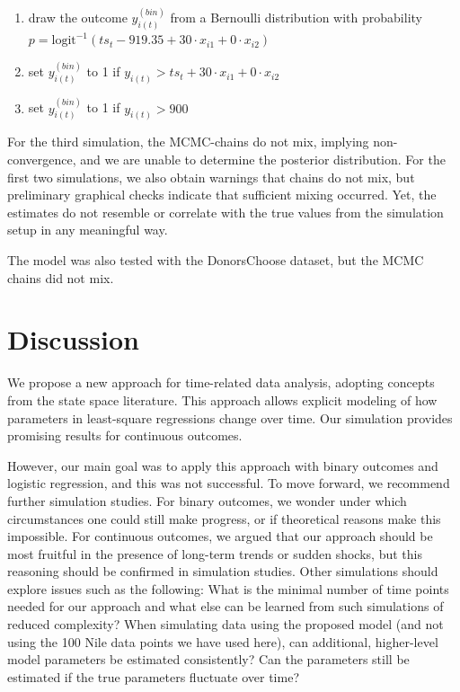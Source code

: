 \documentclass{article}
\begin{document}
\begin{enumerate}
    \item draw the outcome $y^{(bin)}_{i(t)}$ from a Bernoulli distribution with probability $p = \textrm{logit}^{-1}(ts_t - 919.35 + 30 \cdot x_{i1} + 0 \cdot x_{i2})$
    \item set $y^{(bin)}_{i(t)}$ to 1 if $y_{i(t)} > ts_t + 30 \cdot x_{i1} + 0 \cdot x_{i2}$
    \item set $y^{(bin)}_{i(t)}$ to 1 if $y_{i(t)} > 900$
\end{enumerate}

For the third simulation, the MCMC-chains do not mix, implying non-convergence, and we are unable to determine the posterior distribution. For the first two simulations, we also obtain warnings that chains do not mix, but preliminary graphical checks indicate that sufficient mixing occurred. Yet, the estimates do not resemble or correlate with the true values from the simulation setup in any meaningful way.

The model was also tested with the DonorsChoose dataset, but the MCMC chains did not mix.

\section{Discussion}\label{sec:discussion}

We propose a new approach for time-related data analysis, adopting concepts from the state space literature. This approach allows explicit modeling of how parameters in least-square regressions change over time. Our simulation provides promising results for continuous outcomes. 

However, our main goal was to apply this approach with binary outcomes and logistic regression, and this was not successful. To move forward, we recommend further simulation studies. For binary outcomes, we wonder under which circumstances one could still make progress, or if theoretical reasons make this impossible. For continuous outcomes, we argued that our approach should be most fruitful in the presence of long-term trends or sudden shocks, but this reasoning should be confirmed in simulation studies. Other simulations should explore issues such as the following: What is the minimal number of time points needed for our approach and what else can be learned from such simulations of reduced complexity? When simulating data using the proposed model (and not using the 100 Nile data points we have used here), can additional, higher-level model parameters be estimated consistently? Can the parameters still be estimated if the true parameters fluctuate over time?
\end{document}
